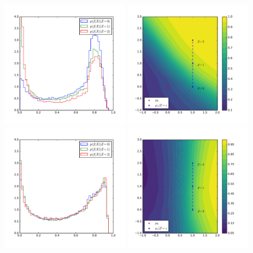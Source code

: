\documentclass[twocolumn,superscriptaddress,aps]{revtex4-1}
\theoremstyle{plain}
\begin{document}
\begin{figure}
    \begin{center}
        \includegraphics[width=0.48\textwidth]{figures/f-plain.pdf}
        \includegraphics[width=0.48\textwidth]{figures/surface-plain.pdf}\\
        \vspace{-0.8cm}
        \includegraphics[width=0.48\textwidth]{figures/f-adversary.pdf}
        \includegraphics[width=0.48\textwidth]{figures/surface-adversary.pdf}

\end{center}
\end{figure}
\end{document}
